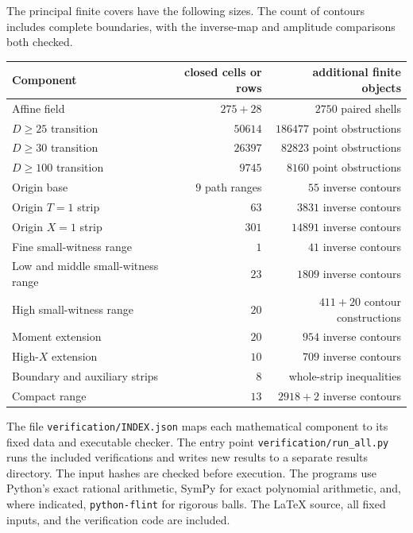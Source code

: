 \documentclass[11pt,reqno]{amsart}
\numberwithin{equation}{section}
\theoremstyle{definition}
\theoremstyle{remark}
\DeclareRobustCommand{\cert}[1]{\nolinkurl{#1}}
\begin{document}
The principal finite covers have the following sizes.
The count of contours includes complete boundaries, with
the inverse-map and amplitude comparisons both checked.
\begin{center}\small
\begin{tabular}{lrr}
\toprule
Component&closed cells or rows&additional finite objects\\
\midrule
Affine field&$275+28$&$2750$ paired shells\\
$D\ge25$ transition&$50614$&$186477$ point obstructions\\
$D\ge30$ transition&$26397$&$82823$ point obstructions\\
$D\ge100$ transition&$9745$&$8160$ point obstructions\\
Origin base&$9$ path ranges&$55$ inverse contours\\
Origin $T=1$ strip&$63$&$3831$ inverse contours\\
Origin $X=1$ strip&$301$&$14891$ inverse contours\\
Fine small-witness range&$1$&$41$ inverse contours\\
Low and middle small-witness range&$23$&$1809$ inverse contours\\
High small-witness range&$20$&$411+20$ contour constructions\\
Moment extension&$20$&$954$ inverse contours\\
High-$X$ extension&$10$&$709$ inverse contours\\
Boundary and auxiliary strips&$8$&whole-strip inequalities\\
Compact range&$13$&$2918+2$ inverse contours\\
\bottomrule
\end{tabular}
\end{center}

The file \cert{verification/INDEX.json} maps each mathematical
component to its fixed data and executable checker. The entry
point \cert{verification/run_all.py} runs the included
verifications and writes new results to a separate results
directory. The input hashes are checked before execution.
The programs use Python's exact rational arithmetic, SymPy
for exact polynomial arithmetic, and, where indicated,
\cert{python-flint} for rigorous balls.
The LaTeX source, all fixed inputs, and the verification code are included.
\end{document}
